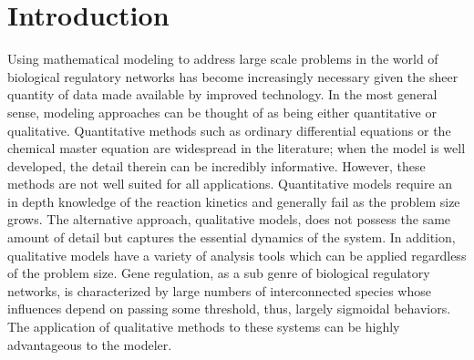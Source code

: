 \documentclass{article}
\begin{document}
\section{Introduction}
Using mathematical modeling to address large scale problems in the world of biological regulatory networks has become increasingly necessary given the sheer quantity of data made available by improved technology. In the most general sense, modeling approaches can be thought of as being either quantitative or qualitative. Quantitative methods such as ordinary differential equations or the chemical master equation are widespread in the literature; when the model is well developed, the detail therein can be incredibly informative. However, these methods are not well suited for all applications. Quantitative models require an in depth knowledge of the reaction kinetics and generally fail as the problem size grows. The alternative approach, qualitative models, does not possess the same amount of detail but captures the essential dynamics of the system. In addition, qualitative models have a variety of analysis tools which can be applied regardless of the problem size. Gene regulation, as a sub genre of biological regulatory networks, is characterized by large numbers of interconnected species whose influences depend on passing some threshold, thus, largely sigmoidal behaviors. The application of qualitative methods to these systems can be highly advantageous to the modeler.\\
\end{document}
